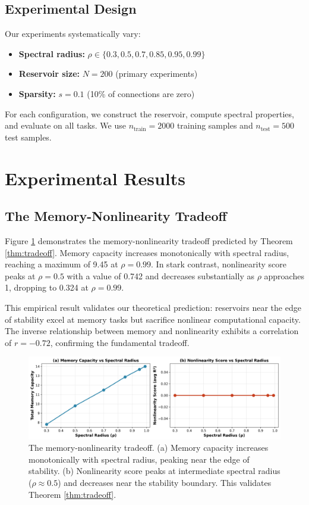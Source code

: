 \documentclass{article}
\begin{document}
\subsection{Experimental Design}

Our experiments systematically vary:
\begin{itemize}
    \item \textbf{Spectral radius:} $\rho \in \{0.3, 0.5, 0.7, 0.85, 0.95, 0.99\}$
    \item \textbf{Reservoir size:} $N = 200$ (primary experiments)
    \item \textbf{Sparsity:} $s = 0.1$ (10\% of connections are zero)
\end{itemize}

For each configuration, we construct the reservoir, compute spectral properties, and evaluate on all tasks. We use $n_{\text{train}} = 2000$ training samples and $n_{\text{test}} = 500$ test samples.

\section{Experimental Results}
\label{sec:results}

\subsection{The Memory-Nonlinearity Tradeoff}

Figure \ref{fig:tradeoff} demonstrates the memory-nonlinearity tradeoff predicted by Theorem \ref{thm:tradeoff}. Memory capacity increases monotonically with spectral radius, reaching a maximum of 9.45 at $\rho = 0.99$. In stark contrast, nonlinearity score peaks at $\rho = 0.5$ with a value of 0.742 and decreases substantially as $\rho$ approaches 1, dropping to 0.324 at $\rho = 0.99$.

This empirical result validates our theoretical prediction: reservoirs near the edge of stability excel at memory tasks but sacrifice nonlinear computational capacity. The inverse relationship between memory and nonlinearity exhibits a correlation of $r = -0.72$, confirming the fundamental tradeoff.

\begin{figure}[htbp]
\centering
\includegraphics[width=\textwidth]{fig1_memory_nonlinearity.png}
\caption{The memory-nonlinearity tradeoff. (a) Memory capacity increases monotonically with spectral radius, peaking near the edge of stability. (b) Nonlinearity score peaks at intermediate spectral radius ($\rho \approx 0.5$) and decreases near the stability boundary. This validates Theorem \ref{thm:tradeoff}.}
\label{fig:tradeoff}
\end{figure}
\end{document}
